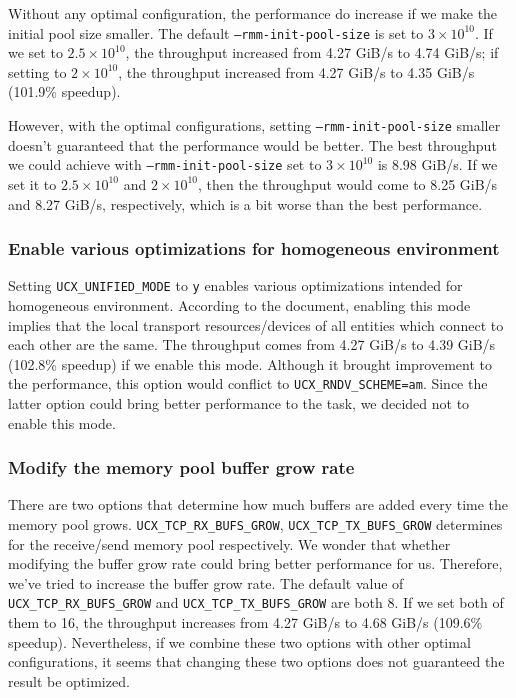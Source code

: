 \documentclass{article}
\begin{document}
Without any optimal configuration, the performance do increase if we make the initial pool size smaller. The default \texttt{--rmm-init-pool-size} is set to $3\times10^{10}$. If we set to $2.5\times10^{10}$, the throughput increased from 4.27 GiB/s to 4.74 GiB/s; if setting to $2\times10^{10}$, the throughput increased from 4.27 GiB/s to 4.35 GiB/s (101.9\% speedup).

However, with the optimal configurations, setting \texttt{--rmm-init-pool-size} smaller doesn't guaranteed that the performance would be better. The best throughput we could achieve with \texttt{--rmm-init-pool-size} set to  $3\times10^{10}$ is 8.98 GiB/s. If we set it to $2.5\times10^{10}$ and $2\times10^{10}$, then the throughput would come to 8.25 GiB/s and 8.27 GiB/s, respectively, which is a bit worse than the best performance. 

\subsubsection{Enable various optimizations for homogeneous environment}

Setting \texttt{UCX\_UNIFIED\_MODE} to \texttt{y} enables various optimizations intended for homogeneous environment. According to the document, enabling this mode implies that the local transport resources/devices of all entities which connect to each other are the same. The throughput comes from 4.27 GiB/s to 4.39 GiB/s (102.8\% speedup) if we enable this mode. Although it brought improvement to the performance, this option would conflict to \texttt{UCX\_RNDV\_SCHEME=am}. Since the latter option could bring better performance to the task, we decided not to enable this mode. 

\subsubsection{Modify the memory pool buffer grow rate}

There are two options that determine how much buffers are added every time the memory pool grows. \texttt{UCX\_TCP\_RX\_BUFS\_GROW}, \texttt{UCX\_TCP\_TX\_BUFS\_GROW} determines for the receive/send memory pool respectively. We wonder that whether modifying the buffer grow rate could bring better performance for us. Therefore, we've tried to increase the buffer grow rate. The default value of \texttt{UCX\_TCP\_RX\_BUFS\_GROW} and \texttt{UCX\_TCP\_TX\_BUFS\_GROW} are both 8. If we set both of them to 16, the throughput increases from 4.27 GiB/s to 4.68 GiB/s (109.6\% speedup). Nevertheless, if we combine these two options with other optimal configurations, it seems that changing these two options does not guaranteed the result be optimized.
\end{document}
